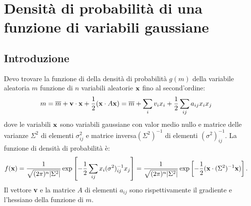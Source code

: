 \newcommand{\fnorm}{f_{y_r}\Sigma^2_{rs}f_{y_s}}
\newcommand{\mbar}{\overline m}
\newcommand{\fone}{f^{(1)}}
\newcommand{\fxes}[1]{f^{(#1)}}
\newcommand{\fcap}{{\cal F}}
\newcommand{\fcapies}{{\cal F}^{(i)}}
\newcommand{\bfp}{{\bf p}}
\newcommand{\bfx}{{\bf x}}
\newcommand{\bfxcap}{{\bf X}}
\newcommand{\bfycap}{{\bf Y}}
\newcommand{\ycapi}{Y^{(i)}}
\newcommand{\bfy}{{\bf y}}
\newcommand{\bfz}{{\bf z}}
\newcommand{\bfw}{{\bf w}}
\newcommand{\Minv}{{\cal M}^{-1}}
\newcommand{\Obs}{{\cal O}}
%
\newcommand{\Stwo}{\Sigma^2}
\newcommand{\de}{\Delta E}
\newcommand{\db}{\Delta\beta}
\newcommand{\ptrad}[1]{{p^{(\theta)}_{t#1}}}
\newcommand{\ptaz}[1]{{p^{(\phi)}_{t#1}}}
\newcommand{\dinvpt}{\Delta(1/p_{\ell t})}
\newcommand{\dtl}{\Delta\tan\lambda_\ell}
\newcommand{\dphi}{\Delta\phi_\ell}
\newcommand{\betanu}{\mbox{\boldmath $\beta$}_\nu}
\newcommand{\Mhad}{M_{W_h}}
\newcommand{\Phad}{\bfp_{W_h}}
\newcommand{\ghad}{\gamma_{W_h}}
\newcommand{\betahad}{\mbox{\boldmath $\beta$}_{W_h}}
\newcommand{\betaw}{\mbox{\boldmath $\beta$}_W}
\newcommand{\betaone}{\mbox{\boldmath $\beta$}_1}
\newcommand{\betatwo}{\mbox{\boldmath $\beta$}_2}
\newcommand{\Mlept}{M_{W_\ell}}
\newcommand{\Elept}{E_{W_\ell}}
\newcommand{\glept}{\gamma_{W_\ell}}
\newcommand{\betalept}{\mbox{\boldmath $\beta$}_{W_\ell}}
%

%
\section{Densit\`a di probabilit\`a di una funzione di variabili gaussiane}
\subsection{Introduzione}
Devo trovare la funzione di della densit\`a di probabilit\`a $g(m)$ della variabile
aleatoria $m$ funzione di $n$ variabili aleatorie ${\bf x}$ fino al second'ordine:
\[m=\mbar+{\bf v\cdot x}+ \frac{1}{2}({\bf x}\cdot A{\bf x})=\mbar+\sum_i v_i x_i+\frac{1}{2}\sum_{ij}a_{ij}x_i x_j\]
dove le variabili ${\bf x}$ sono variabili gaussiane con valor medio nullo e matrice delle varianze $\Stwo$ di elementi $\sigma^2_{ij}$ e matrice inversa$(\Stwo)^{-1}$ di elementi $(\sigma^2)^{-1}_{ij}$. La funzione di densit\`a
di probabilit\`a \`e:\[f({\bf x})=\frac{1}{\sqrt{(2\pi)^n|\Stwo|}}\exp\left[{-\frac{1}{2}\sum_{ij}x_i(\sigma^2)^{-1}_{ij}x_j}\right]=\frac{1}{\sqrt{(2\pi)^n|\Stwo|}}\exp\left[{-\frac{1}{2}({\bf x}\cdot(\Stwo)^{-1}{\bf x})}\right].\]Il vettore {\bf v} e la matrice
$A$ di elementi $a_{ij}$ sono rispettivamente il gradiente e l'hessiano della funzione
di $m$.
